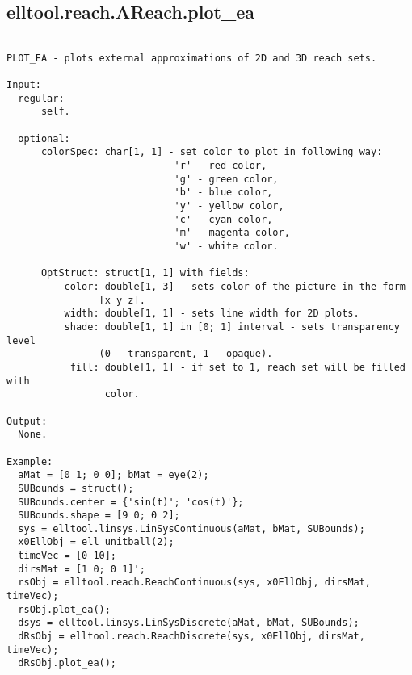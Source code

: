 \subsection{\texorpdfstring{elltool.reach.AReach.plot\_ea}{plot\_ea}}\label{method:elltool.reach.AReach.plotea}
\begin{verbatim}

PLOT_EA - plots external approximations of 2D and 3D reach sets.

Input:
  regular:
      self.

  optional:
      colorSpec: char[1, 1] - set color to plot in following way:
                             'r' - red color,
                             'g' - green color,
                             'b' - blue color,
                             'y' - yellow color,
                             'c' - cyan color,
                             'm' - magenta color,
                             'w' - white color.

      OptStruct: struct[1, 1] with fields:
          color: double[1, 3] - sets color of the picture in the form
                [x y z].
          width: double[1, 1] - sets line width for 2D plots.
          shade: double[1, 1] in [0; 1] interval - sets transparency level
                (0 - transparent, 1 - opaque).
           fill: double[1, 1] - if set to 1, reach set will be filled with
                 color.

Output:
  None.

Example:
  aMat = [0 1; 0 0]; bMat = eye(2);
  SUBounds = struct();
  SUBounds.center = {'sin(t)'; 'cos(t)'};
  SUBounds.shape = [9 0; 0 2];
  sys = elltool.linsys.LinSysContinuous(aMat, bMat, SUBounds);
  x0EllObj = ell_unitball(2);
  timeVec = [0 10];
  dirsMat = [1 0; 0 1]';
  rsObj = elltool.reach.ReachContinuous(sys, x0EllObj, dirsMat, timeVec);
  rsObj.plot_ea();
  dsys = elltool.linsys.LinSysDiscrete(aMat, bMat, SUBounds);
  dRsObj = elltool.reach.ReachDiscrete(sys, x0EllObj, dirsMat, timeVec);
  dRsObj.plot_ea();
\end{verbatim}
